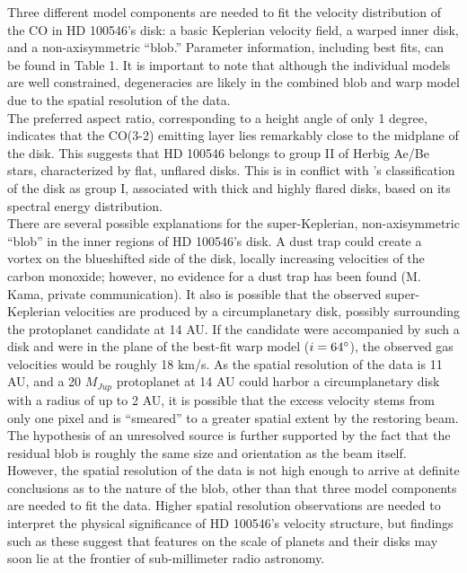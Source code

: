 \documentclass{knac}
\begin{document}
Three different model components are needed to fit the velocity distribution of the CO in HD 100546's disk: a basic Keplerian velocity field, a warped inner disk, and a non-axisymmetric ``blob.'' Parameter information, including best fits, can be found in Table 1. It is important to note that although the individual models are well constrained, degeneracies are likely in the combined blob and warp model due to the spatial resolution of the data. \\
\indent The preferred aspect ratio, corresponding to a height angle of only 1 degree, indicates that the CO(3-2) emitting layer lies remarkably close to the midplane of the disk. This suggests that HD 100546 belongs to  group II of Herbig Ae/Be stars, characterized by flat, unflared disks. This is in conflict with \cite{Meeus01}'s classification of the disk as group I, associated with thick and highly flared disks, based on its spectral energy distribution.\\
\indent There are several possible explanations for the super-Keplerian, non-axisymmetric ``blob'' in the inner regions of HD 100546's disk. A dust trap could create a vortex on the blueshifted side of the disk, locally increasing velocities of the carbon monoxide; however, no evidence for a dust trap has been found (M. Kama, private communication). It also is possible that the observed super-Keplerian velocities are produced by a circumplanetary disk, possibly surrounding the protoplanet candidate at 14 AU. If the candidate were accompanied by such a disk and were in the plane of the best-fit warp model ($i=64\degree$), the observed gas velocities would be roughly 18 km/s. As the spatial resolution of the data is 11 AU, and a 20 $M_{Jup}$ protoplanet at 14 AU could harbor a circumplanetary disk with a radius of up to 2 AU, it is possible that the excess velocity stems from only one pixel and is ``smeared'' to a greater spatial extent by the restoring beam. The hypothesis of an unresolved source is further supported by the fact that the residual blob is roughly the same size and orientation as the beam itself. However, the spatial resolution of the data is not high enough to arrive at definite conclusions as to the nature of the blob, other than that three model components are needed to fit the data. Higher spatial resolution observations are needed to interpret the physical significance of HD 100546's velocity structure, but findings such as these suggest that features on the scale of planets and their disks may soon lie at the frontier of sub-millimeter radio astronomy.
\end{document}
